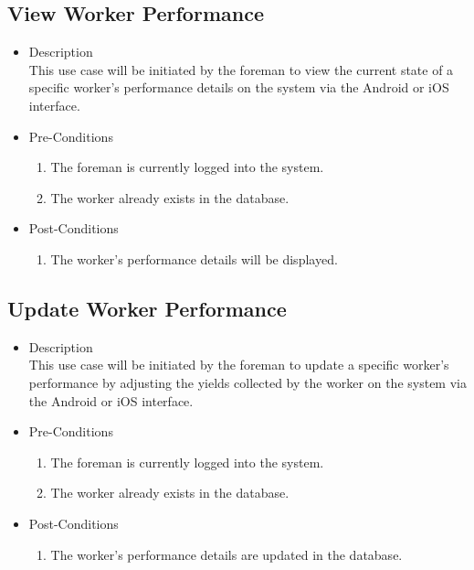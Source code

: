 \documentclass[11pt,fleqn]{book} %
\begin{document}
	\subsection{View Worker Performance}
	\begin{itemize}
		\item Description\\
		This use case will be initiated by the foreman to view the current state of a specific worker’s performance details on the system via the Android or iOS interface.
		\item Pre-Conditions
		\begin{enumerate}
			\item The foreman is currently logged into the system.
			\item The worker already exists in the database.				 
		\end{enumerate}
		\item Post-Conditions
		\begin{enumerate}
			\item The worker’s performance details will be displayed.
		\end{enumerate}
	\end{itemize}
	
	\subsection{Update Worker Performance}
	\begin{itemize}
		\item Description\\
		This use case will be initiated by the foreman to update a specific worker’s performance by adjusting the yields collected by the worker on the system via the Android or iOS interface.
		\item Pre-Conditions
		\begin{enumerate}
			\item The foreman is currently logged into the system.
			\item The worker already exists in the database.			
		\end{enumerate}
		\item Post-Conditions
		\begin{enumerate}
			\item The worker’s performance details are updated in the database.
		\end{enumerate}
	\end{itemize}
	
\end{document}
